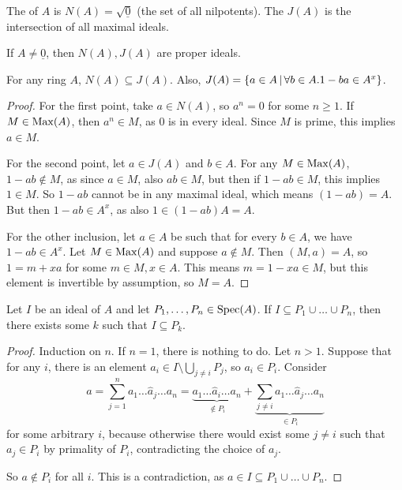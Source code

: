 \begin{definition}
  The  of $A$ is $N(A) = \sqrt{\underline{0}}$ (the set of all
  nilpotents).
  The  $J(A)$ is the intersection of all maximal ideals.
\end{definition}

\begin{remark}
  If $A \ne \underline{0}$, then $N(A), J(A)$ are proper ideals.
\end{remark}

\begin{lemma}
  \label{lemma:koma-01-jacobson}
  For any ring $A$, $N(A) \subseteq J(A)$.
  Also, $J(A) = \{ a \in A \,|\, \forall b \in A . 1 - ba \in A^x \}$.
\end{lemma}

\begin{proof}
  For the first point, take $a \in N(A)$, so $a^n = 0$ for some $n \ge 1$.
  If $M \in \operatorname{Max}(A)$, then $a^n \in M$, as $0$ is in every ideal.
  Since $M$ is prime, this implies $a \in M$.

  For the second point, let $a \in J(A)$ and $b \in A$.
  For any $M \in \operatorname{Max}(A)$, $1 - ab \notin M$, as since $a \in M$, also $ab \in
  M$, but then if $1 - ab \in M$, this implies $1 \in M$.
  So $1 - ab$ cannot be in any maximal ideal, which means $(1-ab) = A$.
  But then $1 - ab \in A^x$, as also $1 \in (1-ab) A = A$.

  For the other inclusion, let $a \in A$ be such that for every $b \in A$, we
  have $1 - ab \in A^x$.
  Let $M \in \operatorname{Max}(A)$ and suppose $a \notin M$.
  Then $(M, a) = A$, so $1 = m + xa$ for some $m \in M, x \in A$.
  This means $m = 1 - xa \in M$, but this element is invertible by assumption,
  so $M = A$.
  \protislovje{}
\end{proof}

\begin{lemma}
  Let $I$ be an ideal of $A$ and let $P_1, \ldots, P_n \in \operatorname{Spec}(A)$.
  If $I \subseteq P_1 \cup \ldots \cup P_n$, then there exists some $k$ such
  that $I \subseteq P_k$.
\end{lemma}

\begin{proof}
  Induction on $n$.
  If $n = 1$, there is nothing to do.
  Let $n > 1$.
  Suppose that for any $i$, there is an element $a_i \in I \setminus \bigcup_{j
	\ne i} P_j$, so $a_i \in P_i$.
  Consider
  \[
	a = \sum_{j=1}^n a_1 \ldots \hat{a}_j \ldots a_n
	= \underbrace{a_1 \ldots \hat{a}_i \ldots a_n}_{\notin P_i} +
	\underbrace{\sum_{j \ne i} a_1 \ldots \hat{a}_j \ldots a_n}_{\in P_i}
  \]
  for some arbitrary $i$, because otherwise there would exist some $j \ne i$
  such that $a_j \in P_i$ by primality of $P_i$, contradicting the choice of
  $a_j$.

  So $a \notin P_i$ for all $i$.
  This is a contradiction, as $a \in I \subseteq P_1 \cup \ldots \cup P_n$.
\end{proof}

